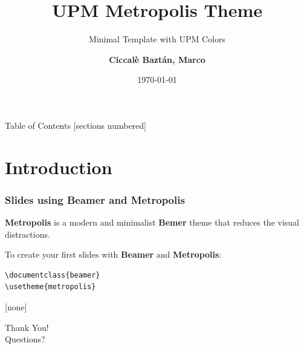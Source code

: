 \documentclass{beamer}
\title{UPM Metropolis Theme}
\subtitle{Minimal Template with UPM Colors}
\author{\textbf{Ciccalè Baztán, Marco}}
\date{\today}
\institute{Universidad Politécnica de Madrid (UPM)}
\begin{document}
\maketitle

\begin{frame}{Table of Contents}
  [sections numbered]
  \tableofcontents
\end{frame}

\section{Introduction} %
\label{sec:Introduction}

\begin{frame}[fragile]
\frametitle{Slides using \textbf{Beamer} and \textbf{Metropolis}}
\textbf{Metropolis} is a modern and minimalist \textbf{Bemer} theme that reduces
the visual distractions.

To create your first slides with \textbf{Beamer} and \textbf{Metropolis}:

\begin{verbatim}
\documentclass{beamer}
\usetheme{metropolis}
\end{verbatim}
\end{frame}


[none]
{
\begin{frame}[standout]
  Thank You!\\Questions?
\end{frame}
}
\end{document}
